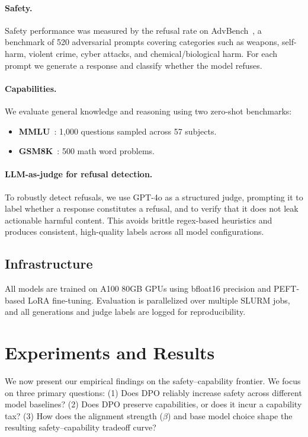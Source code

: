 \documentclass[a4paper, twocolumn, 9pt]{article}
\begin{document}
\paragraph{Safety.}
Safety performance was measured by the refusal rate on AdvBench~\cite{advbench}, a benchmark of 520 adversarial prompts covering categories such as weapons, self-harm, violent crime, cyber attacks, and chemical/biological harm.
For each prompt we generate a response and classify whether the model refuses.

\paragraph{Capabilities.}
We evaluate general knowledge and reasoning using two zero-shot benchmarks:
\begin{itemize}
\item \textbf{MMLU}~\cite{mmlu}: 1,000 questions sampled across 57 subjects.
\item \textbf{GSM8K}~\cite{gsm8k}: 500 math word problems.
\end{itemize}

\paragraph{LLM-as-judge for refusal detection.}
To robustly detect refusals, we use GPT-4o as a structured judge, prompting it to label whether a response constitutes a refusal, and to verify that it does not leak actionable harmful content. This avoids brittle regex-based heuristics and produces consistent, high-quality labels across all model configurations.

\subsection{Infrastructure}

All models are trained on A100 80GB GPUs using bfloat16 precision and PEFT-based LoRA fine-tuning. Evaluation is parallelized over multiple SLURM jobs, and all generations and judge labels are logged for reproducibility.

\section{Experiments and Results}

We now present our empirical findings on the safety--capability frontier.
We focus on three primary questions:
(1) Does DPO reliably increase safety across different model baselines?
(2) Does DPO preserve capabilities, or does it incur a capability tax?
(3) How does the alignment strength ($\beta$) and base model choice shape the resulting safety--capability tradeoff curve?
\end{document}
